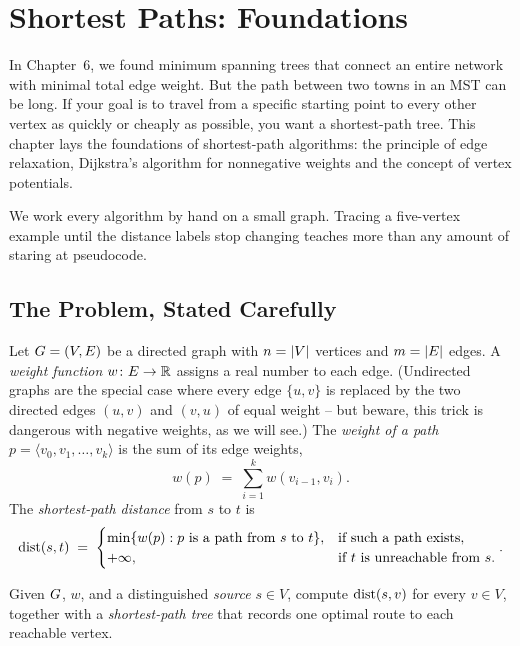 \chapter{Shortest Paths: Foundations}

In Chapter~6, we found minimum spanning trees that connect an entire network with
minimal total edge weight. But the path between two towns in an MST can be long. If your goal is
to travel from a specific starting point to every other vertex as quickly or cheaply as
possible, you want a shortest-path tree. This chapter lays the
foundations of shortest-path algorithms: the principle of edge relaxation, Dijkstra's
algorithm for nonnegative weights and the concept
of vertex potentials.

We work every algorithm by hand on a small graph. Tracing a five-vertex example until the
distance labels stop changing teaches more than any amount of staring at pseudocode.

\chapterline

\section{The Problem, Stated Carefully}
\label{ch07:problem}

Let $G=(V,E)$ be a directed graph with $n=\lvert V\rvert$ vertices and $m=\lvert E\rvert$ edges. A
\emph{weight function} $w\colon E\to\mathbb{R}$ assigns a real number to each edge. (Undirected
graphs are the special case where every edge $\{u,v\}$ is replaced by the two directed
edges $(u,v)$ and $(v,u)$ of equal weight -- but beware, this trick is dangerous with
negative weights, as we will see.) The \emph{weight of a path}
$p = \langle v_0,v_1,\dots,v_k\rangle$ is the sum of its edge weights,
\[
   w(p) \;=\; \sum_{i=1}^{k} w(v_{i-1},v_i).
\]
The \emph{shortest-path distance} from $s$ to $t$ is
\[
   \operatorname{dist}(s,t) \;=\;
   \begin{cases}
     \min\{ w(p) : p \text{ is a path from } s \text{ to } t\}, & \text{if such a path exists},\\
     +\infty, & \text{if } t \text{ is unreachable from } s.
   \end{cases}.
\]

\begin{definition}
\label{ch07:def-sssp}
Given $G$, $w$, and a distinguished \emph{source} $s\in V$, compute $\operatorname{dist}(s,v)$ for
every $v\in V$, together with a \emph{shortest-path tree} that records one optimal route to
each reachable vertex.
\end{definition}

